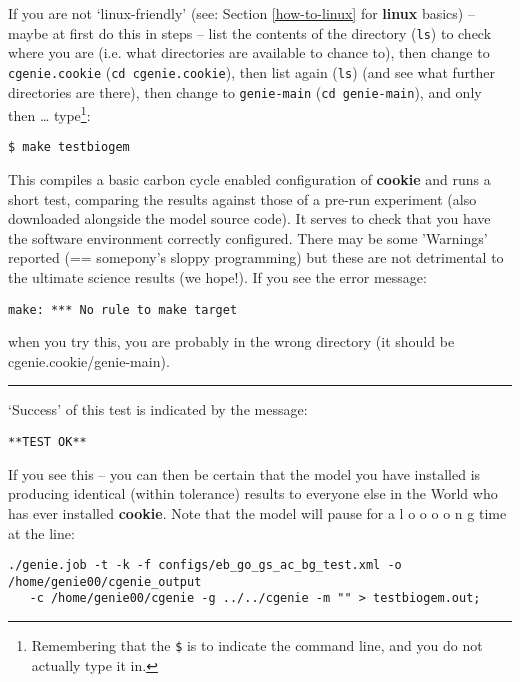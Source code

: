 \noindent If you are not ‘linux-friendly’ (see: Section \ref{how-to-linux} for \textbf{linux} basics) – maybe at first do this in steps – list the contents of the directory (\texttt{ls}) to check where you are (i.e. what directories are available to chance to), then change to \texttt{cgenie.cookie} (\texttt{cd cgenie.cookie}), then list again (\texttt{ls}) (and see what further directories are there), then change to \texttt{genie-main} (\texttt{cd genie-main}), and only then … type\footnote{Remembering that the \texttt{\$} is to indicate the command line, and you do not actually type it in.}:
\vspace{-2mm}
\small\begin{verbatim}
$ make testbiogem
\end{verbatim}\normalsize
\vspace{-2mm}

\noindent This compiles a basic carbon cycle enabled configuration of \textbf{cookie} and runs a short test, comparing the results against those of a pre-run experiment (also downloaded alongside the model source code). It serves to check that you have the software environment correctly configured. There may be some ’Warnings’ reported (== somepony’s sloppy programming) but these are not detrimental to the ultimate science results (we hope!).
\vspace{1mm}
If you see the error message:
\vspace{-2mm}
\small\begin{verbatim}
make: *** No rule to make target 
\end{verbatim}\normalsize
\vspace{-2mm}
when you try this, you are probably in the wrong directory (it should be \textsf{\footnotesize cgenie.cookie/genie-main}).

\vspace{1mm}\noindent\rule{4cm}{0.5pt}\vspace{2mm}

\noindent ‘Success’ of this test is indicated by the message:
\vspace{-1mm}
\small\begin{verbatim}
**TEST OK**
\end{verbatim}\normalsize
\vspace{-1mm}

\noindent If you see this -- you can then be certain that the model you have installed is producing identical (within tolerance) results to everyone else in the World who has ever installed \textbf{cookie}. Note that the model will pause for a l o o o o n g time at the line:
\vspace{-2mm}
\small\begin{verbatim}
./genie.job -t -k -f configs/eb_go_gs_ac_bg_test.xml -o /home/genie00/cgenie_output
   -c /home/genie00/cgenie -g ../../cgenie -m "" > testbiogem.out;
\end{verbatim}\normalsize
\vspace{-2mm}

